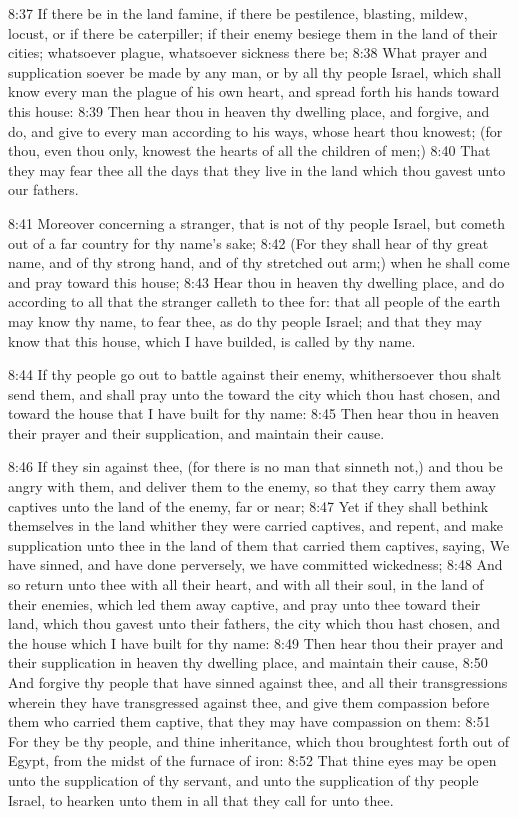 8:37 If there be in the land famine, if there be pestilence, blasting, mildew, locust, or if there be caterpiller; if their enemy besiege them in the land of their cities; whatsoever plague, whatsoever sickness there be; 8:38 What prayer and supplication soever be made by any man, or by all thy people Israel, which shall know every man the plague of his own heart, and spread forth his hands toward this house: 8:39 Then hear thou in heaven thy dwelling place, and forgive, and do, and give to every man according to his ways, whose heart thou knowest; (for thou, even thou only, knowest the hearts of all the children of men;) 8:40 That they may fear thee all the days that they live in the land which thou gavest unto our fathers.

8:41 Moreover concerning a stranger, that is not of thy people Israel, but cometh out of a far country for thy name's sake; 8:42 (For they shall hear of thy great name, and of thy strong hand, and of thy stretched out arm;) when he shall come and pray toward this house; 8:43 Hear thou in heaven thy dwelling place, and do according to all that the stranger calleth to thee for: that all people of the earth may know thy name, to fear thee, as do thy people Israel; and that they may know that this house, which I have builded, is called by thy name.

8:44 If thy people go out to battle against their enemy, whithersoever thou shalt send them, and shall pray unto the \LORD toward the city which thou hast chosen, and toward the house that I have built for thy name: 8:45 Then hear thou in heaven their prayer and their supplication, and maintain their cause.

8:46 If they sin against thee, (for there is no man that sinneth not,) and thou be angry with them, and deliver them to the enemy, so that they carry them away captives unto the land of the enemy, far or near; 8:47 Yet if they shall bethink themselves in the land whither they were carried captives, and repent, and make supplication unto thee in the land of them that carried them captives, saying, We have sinned, and have done perversely, we have committed wickedness; 8:48 And so return unto thee with all their heart, and with all their soul, in the land of their enemies, which led them away captive, and pray unto thee toward their land, which thou gavest unto their fathers, the city which thou hast chosen, and the house which I have built for thy name: 8:49 Then hear thou their prayer and their supplication in heaven thy dwelling place, and maintain their cause, 8:50 And forgive thy people that have sinned against thee, and all their transgressions wherein they have transgressed against thee, and give them compassion before them who carried them captive, that they may have compassion on them: 8:51 For they be thy people, and thine inheritance, which thou broughtest forth out of Egypt, from the midst of the furnace of iron: 8:52 That thine eyes may be open unto the supplication of thy servant, and unto the supplication of thy people Israel, to hearken unto them in all that they call for unto thee.

